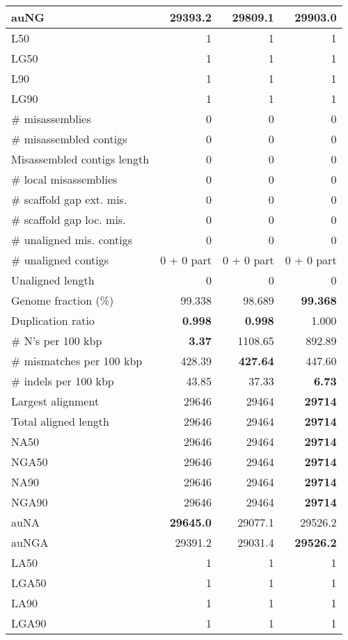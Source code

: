 \documentclass[12pt,a4paper]{article}
\begin{document}
\begin{table}[ht]
\begin{center}
\begin{tabular}{|l*{3}{|r}|}
auNG & 29393.2 & 29809.1 & {\bf 29903.0} \\ \hline
L50 & 1 & 1 & 1 \\ \hline
LG50 & 1 & 1 & 1 \\ \hline
L90 & 1 & 1 & 1 \\ \hline
LG90 & 1 & 1 & 1 \\ \hline
\# misassemblies & 0 & 0 & 0 \\ \hline
\# misassembled contigs & 0 & 0 & 0 \\ \hline
Misassembled contigs length & 0 & 0 & 0 \\ \hline
\# local misassemblies & 0 & 0 & 0 \\ \hline
\# scaffold gap ext. mis. & 0 & 0 & 0 \\ \hline
\# scaffold gap loc. mis. & 0 & 0 & 0 \\ \hline
\# unaligned mis. contigs & 0 & 0 & 0 \\ \hline
\# unaligned contigs & 0 + 0 part & 0 + 0 part & 0 + 0 part \\ \hline
Unaligned length & 0 & 0 & 0 \\ \hline
Genome fraction (\%) & 99.338 & 98.689 & {\bf 99.368} \\ \hline
Duplication ratio & {\bf 0.998} & {\bf 0.998} & 1.000 \\ \hline
\# N's per 100 kbp & {\bf 3.37} & 1108.65 & 892.89 \\ \hline
\# mismatches per 100 kbp & 428.39 & {\bf 427.64} & 447.60 \\ \hline
\# indels per 100 kbp & 43.85 & 37.33 & {\bf 6.73} \\ \hline
Largest alignment & 29646 & 29464 & {\bf 29714} \\ \hline
Total aligned length & 29646 & 29464 & {\bf 29714} \\ \hline
NA50 & 29646 & 29464 & {\bf 29714} \\ \hline
NGA50 & 29646 & 29464 & {\bf 29714} \\ \hline
NA90 & 29646 & 29464 & {\bf 29714} \\ \hline
NGA90 & 29646 & 29464 & {\bf 29714} \\ \hline
auNA & {\bf 29645.0} & 29077.1 & 29526.2 \\ \hline
auNGA & 29391.2 & 29031.4 & {\bf 29526.2} \\ \hline
LA50 & 1 & 1 & 1 \\ \hline
LGA50 & 1 & 1 & 1 \\ \hline
LA90 & 1 & 1 & 1 \\ \hline
LGA90 & 1 & 1 & 1 \\ \hline
\end{tabular}
\end{center}
\end{table}
\end{document}
